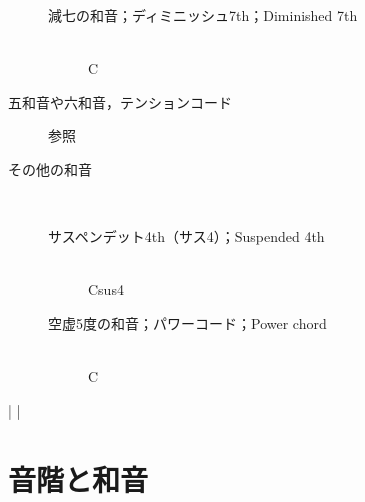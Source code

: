 \documentclass[dvipdfmx,uplatex,b5paper,openany,jbase=12Q,nomag*,textwidth-limit=44%
               ]{gachimuchi}[2020/05/05]
\begin{document}
\begin{description}
\begin{description}
    \item[減七の和音；ディミニッシュ7th；Diminished 7th] ~\\C\Dim{}
  \end{description}
  \item[五和音や六和音，テンションコード]参照
  \item[その他の和音]~
  \begin{description}
    \item[サスペンデット4th（サス4）；Suspended 4th] ~\\Csus4
    \item[空虚5度の和音；パワーコード；Power chord] ~\\C{}
  \end{description}
\end{description}

\begin{Music}[0.9\linewidth]
  \nostartrule%
  \Startpiece
  \Notes%
  \en\bar\Notes
  \en\Notes
  \en\bar\Notes
  \en%
  \endpiece%
\end{Music}

\mainmatter
\chapter{音階と和音}\vspace{-.5zh}%
\end{document}
